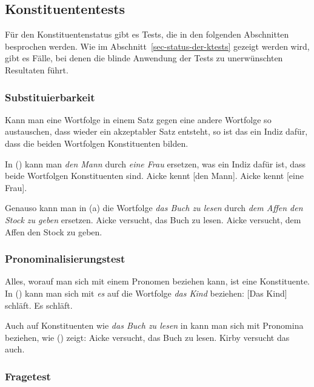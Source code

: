 \subsection{Konstituententests}

Für den Konstituentenstatus gibt es Tests, die in den folgenden Abschnitten besprochen werden.
Wie im Abschnitt~\ref{sec-status-der-ktests} gezeigt werden wird, gibt es Fälle, bei denen die
blinde Anwendung der Tests zu unerwünschten Resultaten führt.

\subsubsection{Substituierbarkeit}

Kann man eine Wortfolge %
in einem Satz gegen eine andere Wortfolge so austauschen, dass
wieder ein akzeptabler Satz entsteht, so ist das ein Indiz dafür, dass 
die beiden Wortfolgen Konstituenten bilden.

In () kann man \emph{den Mann} durch \emph{eine Frau} ersetzen, was ein Indiz dafür
ist, dass beide Wortfolgen Konstituenten sind.
\eal
\ex Aicke kennt [den Mann].
\ex Aicke kennt [eine Frau].
\zl

\noindent
Genauso kann man in (a) die Wortfolge \emph{das Buch zu lesen} durch
\emph{dem Affen den Stock zu geben} ersetzen.
\eal
\ex Aicke versucht, das Buch zu lesen.\label{ex-das-buch-zu-lesen}
\ex Aicke versucht, dem Affen den Stock zu geben.
\zl


\subsubsection{Pronominalisierungstest}

Alles,
worauf man sich mit einem Pronomen beziehen kann, ist eine Konstituente. 
In () kann man sich \zb mit \emph{es} auf die Wortfolge \emph{das Kind} beziehen:
\eal
\ex {}[Das Kind] schläft.
\ex Es schläft.
\zl

\noindent
Auch auf Konstituenten wie \emph{das Buch zu lesen} in 
kann man sich mit Pronomina beziehen, wie () zeigt:
\eal
\ex Aicke versucht, das Buch zu lesen.
\ex Kirby versucht das auch.
\zl


\subsubsection{Fragetest}

